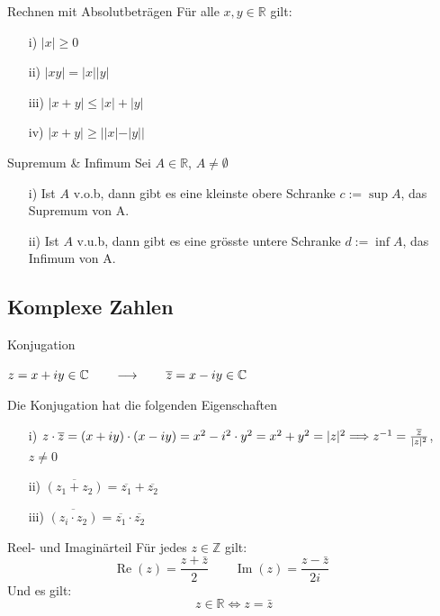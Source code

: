 \documentclass[a4paper,10pt]{article}
\def\R{\mathbb{R}}
\begin{document}
\begin{mainbox}{Rechnen mit Absolutbeträgen}
	Für alle $x,y \in \mathbb{R}$ gilt:
	\begin{multicols}{2}
		\begin{itemize}
			\item[i)] $|x|\geq 0$
			\item[ii)] $|xy|=|x||y|$
			\item[iii)] $|x+y|\leq |x|+|y|$
			\item[iv)] $|x+y|\geq||x|-|y||$
		\end{itemize}
	\end{multicols}
\end{mainbox}

\begin{mainbox}{Supremum \& Infimum}
	Sei $A \in \R$, $A \neq \emptyset$
	\begin{itemize}
		\item[i)] Ist $A$ v.o.b, dann gibt es eine kleinste obere Schranke $c := \sup A$, das Supremum von A.
		\item[ii)] Ist $A$ v.u.b, dann gibt es eine grösste untere Schranke $d := \inf A$, das Infimum von A.
	\end{itemize}
\end{mainbox}
\subsection{Komplexe Zahlen}
\begin{mainbox}{Konjugation}
	\centerline{$z = x + iy \in \mathbb{C} \qquad\longrightarrow\qquad \overline{z} = x - iy \in \mathbb{C}\\$}
	\vspace{10pt}
	Die Konjugation hat die folgenden Eigenschaften
	\begin{itemize}
		\item[i)]  $z \cdot \overline{z} = (x + iy) \cdot (x - iy) = x^2 - i^2 \cdot y^2 \\ = x^2 + y^2 = |z|^2 \Longrightarrow z^{-1} = \frac{\overline{z}}{|z|^2}$, $z \neq 0$
		\item[ii)] $\overline{(z_1 + z_2)} = \overline{z_1} + \overline{z_2}$
		\item[iii)] $\overline{(z_i \cdot z_2)} = \overline{z_1} \cdot \overline{z_2}$
	\end{itemize}
\end{mainbox}
\begin{mainbox}{Reel- und Imaginärteil}
	Für jedes $z\in\mathbb{Z}$ gilt:
	$$
	\operatorname{Re}(z)=\frac{z+\bar{z}}{2} \qquad \operatorname{Im}(z)=\frac{z-\bar{z}}{2i} \qquad
	$$	
	Und es gilt:
	$$z\in\mathbb{R}\Longleftrightarrow z = \bar{z}$$
	
\end{mainbox}
\end{document}
